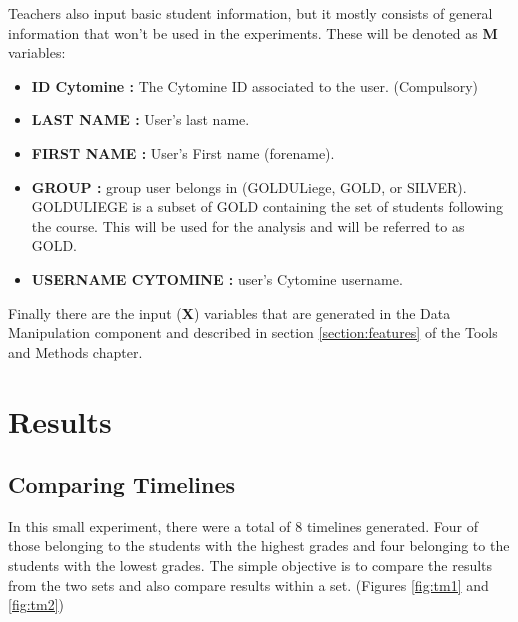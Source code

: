 \documentclass[a4paper,11pt]{report}
\numberwithin{figure}{chapter} %
\begin{document}
    Teachers also input basic student information, but it mostly consists of general information that won't be used in the experiments.
    These will be denoted as \textbf{M} variables:
   	\begin{itemize}
   	\item[\textbullet] \textbf{ID Cytomine :} The Cytomine ID associated to the user. (Compulsory)
    \item[\textbullet] \textbf{LAST NAME :} User's last name.
    \item[\textbullet] \textbf{FIRST NAME :} User's First name (forename).
    \item[\textbullet] \textbf{GROUP :} group user belongs in (GOLDULiege, GOLD, or SILVER).
    GOLDULIEGE is a subset of GOLD containing the set of students following the course.
    This will be used for the analysis and will be referred to as GOLD.
    \item[\textbullet] \textbf{USERNAME CYTOMINE :} user's Cytomine username.
   	\end{itemize}

    Finally there are the input (\textbf{X}) variables that are generated in the Data Manipulation component and described in section \ref{section:features} of the Tools and Methods chapter.

    \section{Results}

    \subsection{Comparing Timelines}

        In this small experiment, there were a total of 8 timelines generated.
        Four of those belonging to the students with the highest grades and four belonging to the students with the lowest grades.
        The simple objective is to compare the results from the two sets and also compare results within a set. (Figures \ref{fig:tm1} and \ref{fig:tm2})
\end{document}
